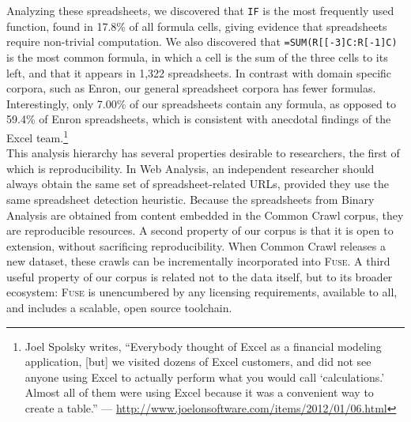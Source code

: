 \documentclass[conference]{IEEEtran}
\begin{document}
Analyzing these spreadsheets, we discovered that \texttt{IF} is the most frequently used function, found in 17.8\% of all formula cells, giving evidence that spreadsheets require non-trivial computation. We also discovered that \texttt{=SUM(R[[-3]C:R[-1]C)} is the most common formula, in which a cell is the sum of the three cells to its left, and that it appears in 1,322 spreadsheets. In contrast with domain specific corpora, such as Enron, our general spreadsheet corpora has fewer formulas. Interestingly, only 7.00\% of our spreadsheets contain any formula, as opposed to 59.4\% of Enron spreadsheets, which is consistent with anecdotal findings of the Excel team.\footnote{Joel Spolsky writes, ``Everybody thought of Excel as a financial modeling application, [but] we visited dozens of Excel customers, and did not see anyone using Excel to actually perform what you would call `calculations.' Almost all of them were using Excel because it was a convenient way to create a table.'' --- \url{http://www.joelonsoftware.com/items/2012/01/06.html}}\\




This analysis hierarchy has several properties desirable to researchers, the first of which is reproducibility.
In Web Analysis, an independent researcher should always obtain the same set of spreadsheet-related URLs, provided they use the same spreadsheet detection heuristic.
Because the spreadsheets from Binary Analysis are obtained from content embedded in the Common Crawl corpus, they are reproducible resources. A second property of our corpus is that it is open to extension, without sacrificing reproducibility. When Common Crawl releases a new dataset, these crawls can be incrementally incorporated into \textsc{Fuse}. A third useful property of our corpus is related not to the data itself, but to its broader ecosystem: \textsc{Fuse} is unencumbered by any licensing requirements, available to all, and includes a scalable, open source toolchain.


\end{document}
